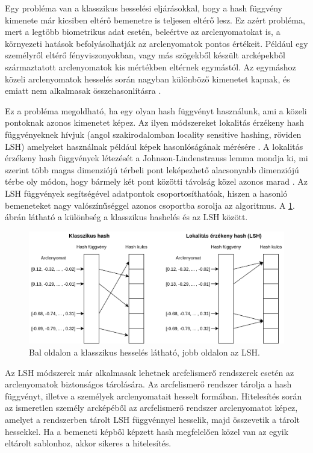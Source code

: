 Egy probléma van a klasszikus hesselési eljárásokkal, hogy a hash függvény kimenete már kicsiben eltérő bemenetre is teljesen eltérő lesz. Ez azért probléma, mert a legtöbb biometrikus adat esetén, beleértve az arclenyomatokat is, a környezeti hatások befolyásolhatják az arclenyomatok pontos értékeit. Például egy személyről eltérő fényviszonyokban, vagy más szögekből készült arcképekből származtatott arclenyomatok kis mértékben eltérnek egymástól. Az egymáshoz közeli arclenyomatok hesselés során nagyban különböző kimenetet kapnak, és emiatt nem alkalmasak összehasonlításra \cite{patel2015cancelable}. 

Ez a probléma megoldható, ha egy olyan hash függvényt használunk, ami a közeli pontoknak azonos kimenetet képez. Az ilyen módszereket lokalitás érzékeny hash függvényeknek hívjuk (angol szakirodalomban locality sensitive hashing, röviden LSH) amelyeket használnak például képek hasonlóságának mérésére \cite{jing2008visualrank}. A lokalitás érzékeny hash függvények létezését a Johnson-Lindenstrauss lemma mondja ki, mi szerint több magas dimenziójú térbeli pont leképezhető alacsonyabb dimenziójú térbe oly módon, hogy bármely két pont közötti távolság közel azonos marad  \cite{johnson1984extensions}. Az LSH függvények segítségével adatpontok csoportosíthatóak, hiszen a hasonló bemeneteket nagy valószínűséggel azonos csoportba sorolja az algoritmus. A \ref{fig:lsh}. ábrán látható a különbség a klasszikus hashelés és az LSH között.

\begin{figure}[ht]
	\centering
	\includegraphics[width=1\columnwidth]{figures/lsh.png}
	\caption{Bal oldalon a klasszikus hesselés látható, jobb oldalon az LSH.}
	\label{fig:lsh}
\end{figure}

Az LSH módszerek már alkalmasak lehetnek arcfelismerő rendszerek esetén az arclenyomatok biztonságos tárolására. Az arcfelismerő rendszer tárolja a hash függvényt, illetve a személyek arclenyomatait hesselt formában. Hitelesítés során az ismeretlen személy arcképéből az arcfelismerő rendszer arclenyomatot képez, amelyet a rendszerben tárolt LSH függvénnyel hesselik, majd összevetik a tárolt hessekkel. Ha a bemeneti képből képzett hash megfelelően közel van az egyik eltárolt sablonhoz, akkor sikeres a hitelesítés.


